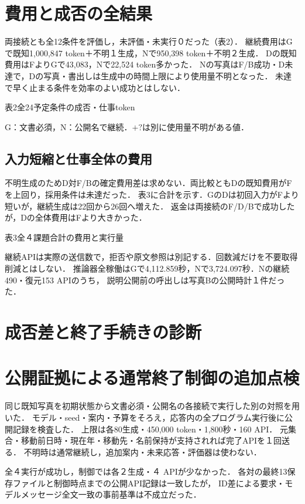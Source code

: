 \documentclass[letter]{ieicej}
\begin{document}
\section{費用と成否の全結果}
両接続とも全12条件を評価し，未評価・未実行０だった（表2）．
継続費用はGで既知1,000,847 token＋不明１生成，Nで950,398 token＋不明２生成．
Dの既知費用はFよりGで43,083，Nで22,524 token多かった．
Nの写真はF/B成功・D未達で，Dの写真・書出しは生成中の時間上限により使用量不明となった．
未達で早く止まる条件を効率のよい成功とはしない．

\begin{center}\begin{minipage}{\columnwidth}\centering
\small 表2\quad 全24予定条件の成否・仕事token\par\smallskip
\PublicDisplayAllCells
\par\smallskip\footnotesize G：文書必須，N：公開名で継続．$+?$は別に使用量不明がある値．
\end{minipage}\end{center}

\subsection{入力短縮と仕事全体の費用}
不明生成のためD対F/Bの確定費用差は求めない．両比較ともDの既知費用がFを上回り，採用条件は未達だった．
表3に合計を示す．GのDは初回入力がFより短いが，継続生成は22回から26回へ増えた．
返金は両接続のF/D/Bで成功したが，Dの全体費用はFより大きかった．

\begin{center}\begin{minipage}{\columnwidth}\centering
\small 表3\quad 全４課題合計の費用と実行量\par\smallskip
\PublicDisplayTotals
\end{minipage}\end{center}

継続APIは実際の送信数で，拒否や原文参照は別記する．回数減だけを不要取得削減とはしない．
推論器全稼働はGで4,112.859秒，Nで3,724.097秒．Nの継続490・復元153 APIのうち，
説明公開前の呼出しは写真Bの公開時計１件だった．

\section{成否差と終了手続きの診断}


\section{公開証拠による通常終了制御の追加点検}
同じ既知写真を初期状態から文書必須・公開名の各接続で実行した別の対照を用いた．
モデル・seed・案内・予算をそろえ，応答内の全プログラム実行後に公開記録を検査した．
上限は各80生成・450,000 token・1,800秒・160 API．
元集合・移動前日時・現在年・移動先・名前保持が支持されれば完了APIを１回送る．
不明時は通常継続し，追加案内・未来応答・評価器は使わない．

全４実行が成功し，制御では各２生成・４ APIが少なかった．
各対の最終13保存ファイルと制御時点までの公開API記録は一致したが，
ID差による要求・モデルメッセージ全文一致の事前基準は不成立だった．
\end{document}
